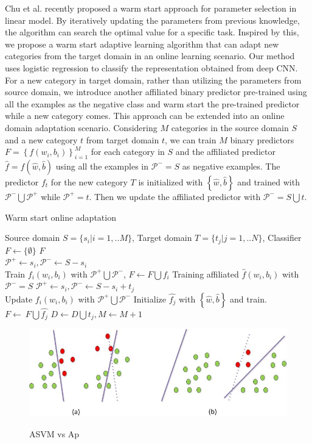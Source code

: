 Chu et al. recently proposed a warm start approach for parameter selection in linear model. By iteratively updating the parameters from previous knowledge, the algorithm can search the optimal value for a specific task\cite{chuwarm}. Inspired by this, we propose a warm start adaptive learning algorithm that can adapt new categories from the target domain in an online learning scenario. Our method uses logistic regression to classify the representation obtained from deep CNN. For a new category in target domain, rather than utilizing the parameters from source domain, we introduce another affiliated binary predictor pre-trained using all the examples as the negative class and warm start the pre-trained predictor while a new category comes. This approach can be extended into an online domain adaptation scenario. Considering $M$ categories in the source domain $S$ and a new category $t$ from target domain $t$, we can train $M$ binary predictors $F=\left\{ {{f}\left( {{w_i},{b_i}} \right)} \right\}_{i = 1}^M$ for each category in $S$ and the affiliated predictor $\hat{f}=f(\hat{w},\hat{b})$ using all the examples in $\mathcal{P^-}=S$ as negative examples. The predictor $f_t$ for the new category $T$ is initialized with $\left\{\hat{w},\hat{b}\right\}$ and trained with $\mathcal{P^-}\bigcup\mathcal{P^+}$ while $\mathcal{P^+}=t$. Then we update the affiliated predictor with $\mathcal{P^-}=S\bigcup t$.
\begin{algorithm}
  \caption{Warm start online adaptation}\label{algo:ws}
  \begin{algorithmic}[1]
    \REQUIRE Source domain $S = \{ {s_i}|i = 1,..M\} $, Target domain $T = \{ {t_j}|j = 1,..N\} $, Classifier $F\leftarrow \{\emptyset\}$
    \ENSURE $F$\\
         \STATE $\mathcal{P^+}\leftarrow s_i, \mathcal{P^-}\leftarrow S-s_i$\\
          Train ${{f_i}\left( {{w_i},{b_i}} \right)}$ with $\mathcal{P^+}\bigcup\mathcal{P^-}$, $F\leftarrow F\bigcup f_i$        
    \ENDFOR
    \STATE Training affiliated $\hat{f}\left( {{w_i},{b_i}} \right)$ with $\mathcal{P^-}=S$
             \STATE $\mathcal{P^+}\leftarrow s_i, \mathcal{P^-}\leftarrow S-s_i+t_j$ \\
              Update ${{f_i}\left( {{w_i},{b_i}} \right)}$ with $\mathcal{P^+}\bigcup\mathcal{P^-}$
        \ENDFOR
        \STATE Initialize $\hat{f_j}$ with $\left\{\hat{w},\hat{b}\right\}$ and train.
        \STATE $F\leftarrow\ F\bigcup \hat{f_j}$ 
        \STATE $D\leftarrow D\bigcup t_j, M\leftarrow M+1$ 
     \ENDWHILE
  \end{algorithmic}
\end{algorithm} 

\begin{figure}
  \centering
  \includegraphics[scale = .6]{fig/domain.jpg}\\
  \caption{ASVM vs Ap}
\end{figure}
